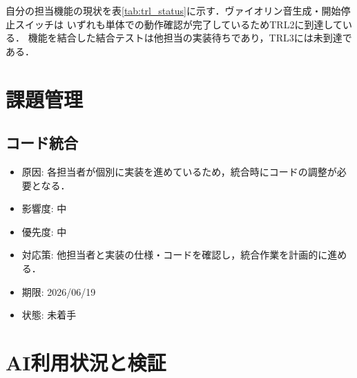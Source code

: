 \documentclass[lualatex,paper=a4paper,jafontsize=11.5pt,jafontscale=1.05]{jlreq}
\begin{document}
自分の担当機能の現状を表\ref{tab:trl_status}に示す．ヴァイオリン音生成・開始停止スイッチは
いずれも単体での動作確認が完了しているためTRL2に到達している．
機能を結合した結合テストは他担当の実装待ちであり，TRL3には未到達である．

\begin{table}[H]
  \centering
  \caption{担当機能のTRL現状}
  \label{tab:trl_status}
\end{table}

\section{課題管理}

\subsection{コード統合}
\begin{itemize}
  \item 原因: 各担当者が個別に実装を進めているため，統合時にコードの調整が必要となる．
  \item 影響度: 中
  \item 優先度: 中
  \item 対応策: 他担当者と実装の仕様・コードを確認し，統合作業を計画的に進める．
  \item 期限: 2026/06/19
  \item 状態: 未着手
\end{itemize}



\section{AI利用状況と検証}
\end{document}
